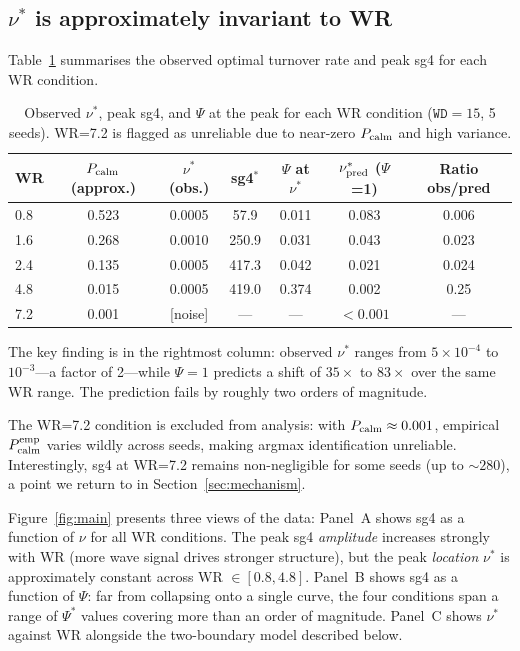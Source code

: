 \documentclass[11pt]{article}
\begin{document}
\subsection{$\nu^*$ is approximately invariant to WR}

Table~\ref{tab:results} summarises the observed optimal turnover rate and peak
sg4 for each WR condition.

\begin{table}[h]
\centering
\caption{Observed $\nu^*$, peak sg4, and $\Psi$ at the peak for each WR condition
($\texttt{WD}=15$, 5 seeds).
WR=7.2 is flagged as unreliable due to near-zero $P_{\rm calm}$ and high variance.}
\label{tab:results}
\begin{tabular}{lcccccc}
\toprule
WR & $P_{\rm calm}$ (approx.) & $\nu^*$ (obs.) & sg4$^*$ & $\Psi$ at $\nu^*$ & $\nu^*_{\rm pred}$ ($\Psi$=1) & Ratio obs/pred \\
\midrule
0.8  & 0.523 & 0.0005 & 57.9  & 0.011 & 0.083 & 0.006 \\
1.6  & 0.268 & 0.0010 & 250.9 & 0.031 & 0.043 & 0.023 \\
2.4  & 0.135 & 0.0005 & 417.3 & 0.042 & 0.021 & 0.024 \\
4.8  & 0.015 & 0.0005 & 419.0 & 0.374 & 0.002 & 0.25  \\
7.2  & 0.001 & [noise] & ---  & ---   & $<0.001$ & ---  \\
\bottomrule
\end{tabular}
\end{table}

The key finding is in the rightmost column: observed $\nu^*$ ranges from
$5\times10^{-4}$ to $10^{-3}$---a factor of 2---while $\Psi=1$ predicts a shift
of $35\times$ to $83\times$ over the same WR range.
The prediction fails by roughly two orders of magnitude.

The WR=7.2 condition is excluded from analysis: with $P_{\rm calm} \approx 0.001$,
empirical $P_{\rm calm}^{\rm emp}$ varies wildly across seeds, making argmax
identification unreliable.
Interestingly, sg4 at WR=7.2 remains non-negligible for some seeds (up to $\sim280$),
a point we return to in Section~\ref{sec:mechanism}.

Figure~\ref{fig:main} presents three views of the data:
Panel~A shows sg4 as a function of $\nu$ for all WR conditions.
The peak sg4 \emph{amplitude} increases strongly with WR (more wave signal drives
stronger structure), but the peak \emph{location} $\nu^*$ is approximately
constant across WR $\in [0.8, 4.8]$.
Panel~B shows sg4 as a function of $\Psi$: far from collapsing onto a single curve,
the four conditions span a range of $\Psi^*$ values covering more than an order
of magnitude.
Panel~C shows $\nu^*$ against WR alongside the two-boundary model described below.
\end{document}
